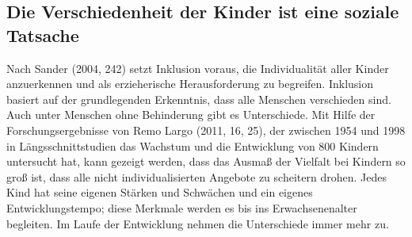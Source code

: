 \subsection{Die Verschiedenheit der Kinder ist eine soziale Tatsache}\label{sec:heterogenität}
Nach Sander (2004, 242) setzt Inklusion voraus, die Individualität aller Kinder anzuerkennen und als erzieherische Herausforderung zu begreifen. Inklusion basiert auf der grundlegenden Erkenntnis, dass alle Menschen verschieden sind. Auch unter Menschen ohne Behinderung gibt es Unterschiede. Mit Hilfe der Forschungsergebnisse von Remo Largo (2011, 16, 25), der zwischen 1954 und 1998 in Längsschnittstudien das Wachstum und die Entwicklung von 800 Kindern untersucht hat, kann gezeigt werden, dass das Ausmaß der Vielfalt bei Kindern so groß ist, dass alle nicht individualisierten Angebote zu scheitern drohen. Jedes Kind hat seine eigenen Stärken und Schwächen und ein eigenes Entwicklungstempo; diese Merkmale werden es bis ins Erwachsenenalter begleiten. Im Laufe der Entwicklung nehmen die Unterschiede immer mehr zu. 

